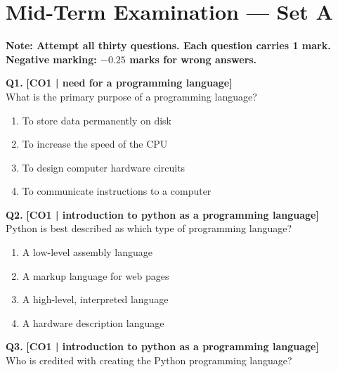 \section{Mid-Term Examination --- Set A}


\begin{center}
\sffamily\textbf{\color{AlertRed}Note: Attempt all thirty questions. Each question carries 1 mark. Negative marking: $-0.25$ marks for wrong answers.}
\end{center}

\noindent\textbf{Q1.} \hfill {\small\color{LPUOrange}\textbf{[CO1 | need for a programming language]}}\\[2pt]
What is the primary purpose of a programming language?

\begin{enumerate}[label=(\alph*),topsep=2pt,itemsep=1pt,partopsep=0pt,parsep=0pt]
    \item \relax To store data permanently on disk
    \item \relax To increase the speed of the CPU
    \item \relax To design computer hardware circuits
    \item \relax To communicate instructions to a computer
\end{enumerate}
\vspace{{2mm}}

\noindent\textbf{Q2.} \hfill {\small\color{LPUOrange}\textbf{[CO1 | introduction to python as a programming language]}}\\[2pt]
Python is best described as which type of programming language?

\begin{enumerate}[label=(\alph*),topsep=2pt,itemsep=1pt,partopsep=0pt,parsep=0pt]
    \item \relax A low-level assembly language
    \item \relax A markup language for web pages
    \item \relax A high-level, interpreted language
    \item \relax A hardware description language
\end{enumerate}
\vspace{{2mm}}

\noindent\textbf{Q3.} \hfill {\small\color{LPUOrange}\textbf{[CO1 | introduction to python as a programming language]}}\\[2pt]
Who is credited with creating the Python programming language?

